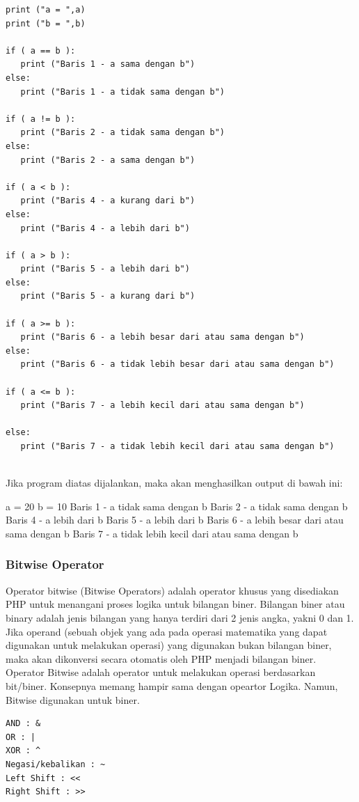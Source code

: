 \begin{verbatim}
print ("a = ",a)
print ("b = ",b)

if ( a == b ):
   print ("Baris 1 - a sama dengan b")
else:
   print ("Baris 1 - a tidak sama dengan b")

if ( a != b ):
   print ("Baris 2 - a tidak sama dengan b")
else:
   print ("Baris 2 - a sama dengan b")

if ( a < b ):
   print ("Baris 4 - a kurang dari b") 
else:
   print ("Baris 4 - a lebih dari b")

if ( a > b ):
   print ("Baris 5 - a lebih dari b") 
else:
   print ("Baris 5 - a kurang dari b")

if ( a >= b ):
   print ("Baris 6 - a lebih besar dari atau sama dengan b") 
else:
   print ("Baris 6 - a tidak lebih besar dari atau sama dengan b") 

if ( a <= b ):
   print ("Baris 7 - a lebih kecil dari atau sama dengan b") 

else:
   print ("Baris 7 - a tidak lebih kecil dari atau sama dengan b")    
   
\end{verbatim}

Jika program diatas dijalankan, maka akan menghasilkan output di bawah ini:

a =  20
b =  10
Baris 1 - a tidak sama dengan b
Baris 2 - a tidak sama dengan b
Baris 4 - a lebih dari b
Baris 5 - a lebih dari b
Baris 6 - a lebih besar dari atau sama dengan b
Baris 7 - a tidak lebih kecil dari atau sama dengan b

\subsubsection{Bitwise Operator}
Operator bitwise (Bitwise Operators) adalah operator khusus yang disediakan PHP untuk menangani proses logika untuk bilangan biner. Bilangan biner atau binary adalah jenis bilangan yang hanya terdiri dari 2 jenis angka, yakni 0 dan 1. Jika operand (sebuah objek yang ada pada operasi matematika yang dapat digunakan untuk melakukan operasi) yang digunakan bukan bilangan biner, maka akan dikonversi secara otomatis oleh PHP menjadi bilangan biner. Operator Bitwise adalah operator untuk melakukan operasi berdasarkan bit/biner. Konsepnya memang hampir sama dengan opeartor Logika. Namun, Bitwise digunakan untuk biner.
\begin{verbatim}
AND : &
OR : |
XOR : ^
Negasi/kebalikan : ~
Left Shift : <<
Right Shift : >>
\end{verbatim}

